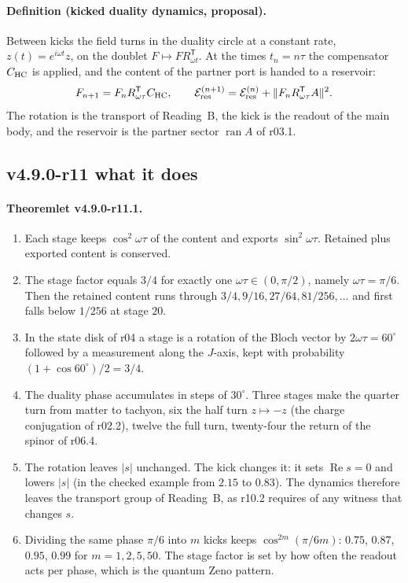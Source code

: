 \paragraph{Definition (kicked duality dynamics, proposal).}
Between kicks the field turns in the duality circle at a constant rate, \(z(t)=e^{i\omega t}z\), on the doublet
\(F\mapsto FR_{\omega t}^{\mathsf T}\).  At the times \(t_n=n\tau\) the compensator \(C_{\mathrm{HC}}\) is applied, and the content of the
partner port is handed to a reservoir:
\[
F_{n+1}=F_nR_{\omega\tau}^{\mathsf T}C_{\mathrm{HC}},\qquad
\mathcal E_{\rm res}^{(n+1)}=\mathcal E_{\rm res}^{(n)}+\|F_nR_{\omega\tau}^{\mathsf T}A\|^2 .
\]
The rotation is the transport of Reading~B, the kick is the readout of the main body, and the reservoir is the partner
sector \(\operatorname{ran}A\) of r03.1.

\subsection*{v4.9.0-r11 what it does}
\label{subsec:v490-r11-properties}

\paragraph{Theoremlet v4.9.0-r11.1.}
\begin{enumerate}[leftmargin=2em]
\item[(a)] Each stage keeps \(\cos^2\omega\tau\) of the content and exports \(\sin^2\omega\tau\).  Retained plus exported
content is conserved.
\item[(b)] The stage factor equals \(3/4\) for exactly one \(\omega\tau\in(0,\pi/2)\), namely \(\omega\tau=\pi/6\).  Then the
retained content runs through \(3/4,9/16,27/64,81/256,\ldots\) and first falls below \(1/256\) at stage \(20\).
\item[(c)] In the state disk of r04 a stage is a rotation of the Bloch vector by \(2\omega\tau=60^\circ\) followed by a
measurement along the \(J\)-axis, kept with probability \((1+\cos60^\circ)/2=3/4\).
\item[(d)] The duality phase accumulates in steps of \(30^\circ\).  Three stages make the quarter turn from matter to
tachyon, six the half turn \(z\mapsto-z\) (the charge conjugation of r02.2), twelve the full turn, twenty-four the return of
the spinor of r06.4.
\item[(e)] The rotation leaves \(|s|\) unchanged.  The kick changes it: it sets \(\operatorname{Re}s=0\) and lowers
\(|s|\) (in the checked example from \(2.15\) to \(0.83\)).  The dynamics therefore leaves the transport group of
Reading~B, as r10.2 requires of any witness that changes \(s\).
\item[(f)] Dividing the same phase \(\pi/6\) into \(m\) kicks keeps \(\cos^{2m}(\pi/6m)\): \(0.75\), \(0.87\), \(0.95\), \(0.99\)
for \(m=1,2,5,50\).  The stage factor is set by how often the readout acts per phase, which is the quantum Zeno pattern.
\end{enumerate}

